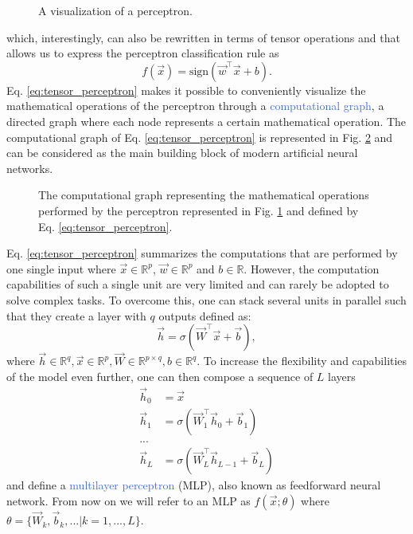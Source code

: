 \begin{figure}[ht!]
	\centering
	
\caption{A visualization of a perceptron.}
\label{fig:perceptron}
\end{figure}
which, interestingly, can also be rewritten in terms of tensor operations and that allows us to express the perceptron classification rule as 
\begin{equation}
	f(\vec{x}) = \text{sign}(\vec{w}^\intercal \vec{x} + b).
	\label{eq:tensor_perceptron}
\end{equation}
Eq. \ref{eq:tensor_perceptron} makes it possible to conveniently visualize the mathematical operations of the perceptron through a \textcolor{RoyalBlue}{computational graph}, a directed graph where each node represents a certain mathematical operation. The computational graph of Eq. \ref{eq:tensor_perceptron} is represented in Fig. \ref{fig:computational_graph_0} and can be considered as the main building block of modern artificial neural networks.
\begin{figure}[ht!]
	\centering
	
	\caption{The computational graph representing the mathematical operations performed by the perceptron represented in Fig. \ref{fig:perceptron} and defined by Eq. \ref{eq:tensor_perceptron}.}
\label{fig:computational_graph_0}
\end{figure}

Eq. \ref{eq:tensor_perceptron} summarizes the computations that are performed by one single input where $\vec{x}\in\mathds{R}^{p}$, $\vec{w}\in\mathds{R}^{p}$ and $b\in\mathds{R}$. However, the computation capabilities of such a single unit are very limited and can rarely be adopted to solve complex tasks. To overcome this, one can stack several units in parallel such that they create a layer with $q$ outputs defined as:
\begin{equation}
	\vec{h} = \sigma(\vec{W}^\intercal\vec{x}+\vec{b}),
\end{equation}
where $\vec{h}\in\mathds{R}^{q},\vec{x}\in\mathds{R}^{p},\vec{W}\in\mathds{R}^{p\times q},b\in\mathds{R}^{q}$. To increase the flexibility and capabilities of the model even further, one can then compose a sequence of $L$ layers
\begin{equation}
	\begin{split}
		\vec{h}_0 & = \vec{x} \\ 
		\vec{h}_1 & = \sigma(\vec{W}^{\intercal}_{1}\vec{h}_0 + \vec{b}_1) \\ 
	... \\
		\vec{h}_L & = \sigma(\vec{W}^{\intercal}_{L}\vec{h}_{L-1}+\vec{b}_{L})
	\end{split}
\end{equation}
and define a \textcolor{RoyalBlue}{multilayer perceptron} (MLP), also known as feedforward neural network. From now on we will refer to an MLP as $f(\vec{x};\theta)$ where $\theta=\{\vec{W}_k,\vec{b}_k,...|k=1,...,L\}$. 

